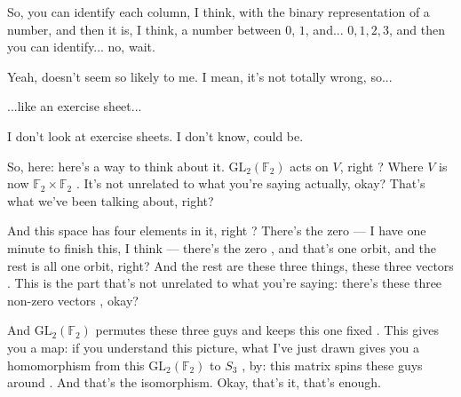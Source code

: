 \begin{student}
So, you can identify each column, I think, with the binary representation of a number, and then it is, I think, a number between $0$, $1$, and... $0, 1, 2, 3$, and then you can identify... no, wait.
\end{student}

\begin{speech}[01:28:00 - 01:28:05]
Yeah, doesn't seem so likely to me. I mean, it's not totally wrong, so...
\end{speech}

\begin{student}
...like an exercise sheet...
\end{student}

\begin{speech}[01:28:08 - 01:29:23]
I don't look at exercise sheets. I don't know, could be.

So, here: here's a way to think about it. $\mathrm{GL}_2(\mathbb{F}_2)$ acts on $V$, right ? Where $V$ is now $\mathbb{F}_2 \times \mathbb{F}_2$ . It's not unrelated to what you're saying actually, okay? That's what we've been talking about, right?

And this space has four elements in it, right ? There's the zero --- I have one minute to finish this, I think --- there's the zero , and that's one orbit, and the rest is all one orbit, right? And the rest are these three things, these three vectors . This is the part that's not unrelated to what you're saying: there's these three non-zero vectors , okay?

And $\mathrm{GL}_2(\mathbb{F}_2)$ permutes these three guys and keeps this one fixed . This gives you a map: if you understand this picture, what I've just drawn gives you a homomorphism from this $\mathrm{GL}_2(\mathbb{F}_2)$ to $S_3$ , by: this matrix spins these guys around . And that's the isomorphism. Okay, that's it, that's enough.
\end{speech}

